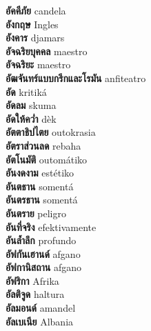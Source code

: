 \textbf{ อัคคีภัย  } candela \\
\textbf{ อังกฤษ  } Ingles \\
\textbf{ อังคาร  } djamars \\
\textbf{ อัจฉริยบุคคล  } maestro \\
\textbf{ อัจฉริยะ  } maestro \\
\textbf{ อัฒจันทร์แบบกรีกและโรมัน  } anfiteatro \\
\textbf{ อัด  } kritiká \\
\textbf{ อัดลม  } skuma \\
\textbf{ อัดให้คว่ำ  } dèk \\
\textbf{ อัตตาธิปไตย  } outokrasia \\
\textbf{ อัตราส่วนลด  } rebaha \\
\textbf{ อัตโนมัติ  } outomátiko \\
\textbf{ อันงดงาม  } estétiko \\
\textbf{ อันตธาน  } somentá \\
\textbf{ อันตรธาน  } somentá \\
\textbf{ อันตราย  } peligro \\
\textbf{ อันที่จริง  } efektivamente \\
\textbf{ อันล้ำลึก  } profundo \\
\textbf{ อัฟกันเฮานด์  } afgano \\
\textbf{ อัฟกานิสถาน  } afgano \\
\textbf{ อัฟริกา  } Afrika \\
\textbf{ อัลติจูด  } haltura \\
\textbf{ อัลมอนด์  } amandel \\
\textbf{ อัลเบเนีย  } Albania \\
